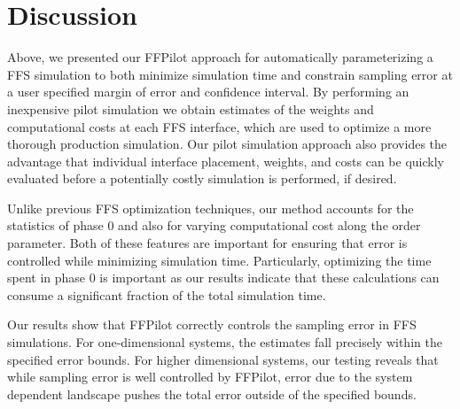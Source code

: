 %
%
%
%

\section{Discussion}


Above, we presented our FFPilot approach for automatically parameterizing a FFS simulation to both minimize simulation time and constrain sampling error at a user specified margin of error and confidence interval. By performing an inexpensive pilot simulation we obtain estimates of the weights and computational costs at each FFS interface, which are used to optimize a more thorough production simulation. Our pilot simulation approach also provides the advantage that individual interface placement, weights, and costs can be quickly evaluated before a potentially costly simulation is performed, if desired.

Unlike previous FFS optimization techniques, our method accounts for the statistics of phase 0 and also for varying computational cost along the order parameter. Both of these features are important for ensuring that error is controlled while minimizing simulation time. Particularly, optimizing the time spent in phase 0 is important as our results indicate that these calculations can consume a significant fraction of the total simulation time.

Our results show that FFPilot correctly controls the sampling error in FFS simulations. For one-dimensional systems, the  estimates fall precisely within the specified error bounds. For higher dimensional systems, our testing reveals that while sampling error is well controlled by FFPilot, error due to the system dependent landscape pushes the total error outside of the specified bounds.


